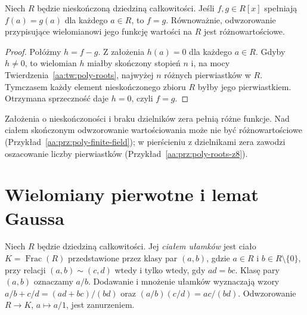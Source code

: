 \begin{wniosek}
\label{aa:wn:poly-evaluation-infinite-domain}
Niech $R$ będzie nieskończoną dziedziną całkowitości.
Jeśli $f,g\in R[x]$ spełniają $f(a)=g(a)$ dla każdego
$a\in R$, to $f=g$. Równoważnie, odwzorowanie przypisujące
wielomianowi jego funkcję wartości na $R$ jest różnowartościowe.
\end{wniosek}
\begin{proof}
Połóżmy $h=f-g$. Z założenia $h(a)=0$ dla każdego
$a\in R$. Gdyby $h\ne0$, to wielomian $h$ miałby
skończony stopień $n$ i, na mocy
Twierdzenia~\ref{aa:tw:poly-roots}, najwyżej $n$
różnych pierwiastków w $R$. Tymczasem każdy element
nieskończonego zbioru $R$ byłby jego pierwiastkiem.
Otrzymana sprzeczność daje $h=0$, czyli $f=g$.
\end{proof}
\begin{uwaga}
Założenia o nieskończoności i braku dzielników zera
pełnią różne funkcje. Nad ciałem skończonym odwzorowanie
wartościowania może nie być różnowartościowe
(Przykład~\ref{aa:prz:poly-finite-field}); w pierścieniu
z dzielnikami zera zawodzi oszacowanie liczby pierwiastków
(Przykład~\ref{aa:prz:poly-roots-z8}).
\end{uwaga}

\section{Wielomiany pierwotne i lemat Gaussa}
\begin{definicja}
\label{aa:def:fracfield}
Niech $R$ będzie dziedziną całkowitości. Jej
\emph{ciałem ułamków} jest ciało $K=\operatorname{Frac}(R)$
przedstawione przez klasy par $(a,b)$, gdzie $a\in R$
i $b\in R\setminus\{0\}$, przy relacji
$(a,b)\sim(c,d)$ wtedy i tylko wtedy, gdy $ad=bc$.
Klasę pary $(a,b)$ oznaczamy $a/b$.
Dodawanie i mnożenie ułamków wyznaczają wzory
$a/b+c/d=(ad+bc)/(bd)$ oraz $(a/b)(c/d)=ac/(bd)$.
Odwzorowanie $R\to K$, $a\mapsto a/1$, jest zanurzeniem.
\end{definicja}

